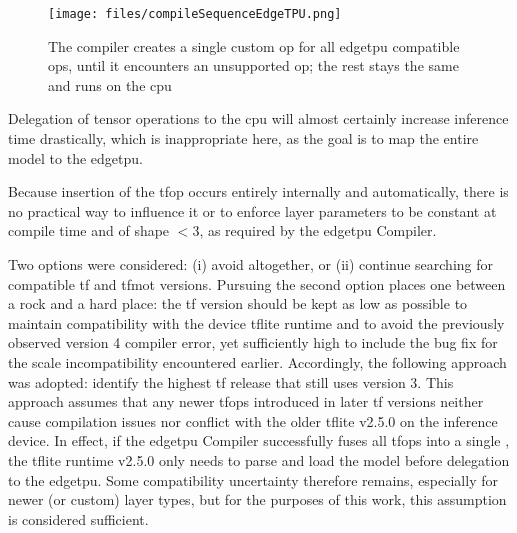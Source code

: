 {\begin{figure}[htbp]
  \centering
  \texttt{[image: files/compileSequenceEdgeTPU.png]}


  \caption{The compiler creates a single custom op for all \gls{edgetpu} compatible ops, until it encounters an unsupported op; the rest stays the same and runs on the \gls{cpu}}
  \label{fig:compileSeqEdgeTPU}
\end{figure}

Delegation of tensor operations to the \gls{cpu} will almost certainly increase inference time drastically, which is inappropriate here,
as the goal is to map the entire model to the \gls{edgetpu}.

Because insertion of the  \gls{tfop} occurs entirely internally and automatically,
there is no practical way to influence it or to enforce layer parameters to be constant at compile time and of shape \(<3\), as required by the \gls{edgetpu} Compiler.

Two options were considered: (i) avoid  altogether, or (ii) continue searching for compatible \gls{tf} and \gls{tfmot} versions.
Pursuing the second option places one between a rock and a hard place:
the \gls{tf} version should be kept as low as possible to maintain compatibility with the device \gls{tflite} runtime and
to avoid the previously observed  version 4 compiler error, yet sufficiently high to include the bug fix for the scale incompatibility encountered earlier.
Accordingly, the following approach was adopted: identify the highest \gls{tf} release that still uses  version 3.
This approach assumes that any newer \glspl{tfop} introduced in later \gls{tf} versions neither cause compilation issues nor conflict with the older \gls{tflite} v2.5.0 on the inference device.
In effect, if the \gls{edgetpu} Compiler successfully fuses all \glspl{tfop} into a single ,
the \gls{tflite} runtime v2.5.0 only needs to parse and load the model before delegation to the \gls{edgetpu}.
Some compatibility uncertainty therefore remains, especially for newer (or custom) layer types, but for the purposes of this work, this assumption is considered sufficient.

}
